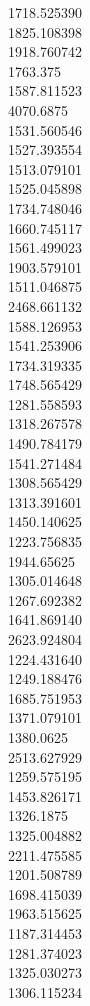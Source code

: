 1718.525390\\
1825.108398\\
1918.760742\\
1763.375\\
1587.811523\\
4070.6875\\
1531.560546\\
1527.393554\\
1513.079101\\
1525.045898\\
1734.748046\\
1660.745117\\
1561.499023\\
1903.579101\\
1511.046875\\
2468.661132\\
1588.126953\\
1541.253906\\
1734.319335\\
1748.565429\\
1281.558593\\
1318.267578\\
1490.784179\\
1541.271484\\
1308.565429\\
1313.391601\\
1450.140625\\
1223.756835\\
1944.65625\\
1305.014648\\
1267.692382\\
1641.869140\\
2623.924804\\
1224.431640\\
1249.188476\\
1685.751953\\
1371.079101\\
1380.0625\\
2513.627929\\
1259.575195\\
1453.826171\\
1326.1875\\
1325.004882\\
2211.475585\\
1201.508789\\
1698.415039\\
1963.515625\\
1187.314453\\
1281.374023\\
1325.030273\\
1306.115234\\
